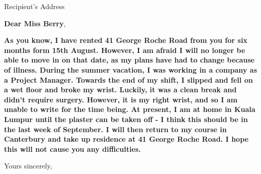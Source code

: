 \documentclass[a4paper,12pt]{letter}
\begin{document}
 
\address{Beijing, China}

\signature{Zhang Wei}

\begin{letter}{Recipient's Address}

\opening{\textbf{Dear Miss Berry},}

\textbf{\color{red} As you know, I have rented 41 George Roche Road from you for six months form 15th August. However, I am afraid I will no longer be able to move in on that date, as my plans have had to change because of illness. During the summer vacation,  I was working in a company as a Project Manager. Towards the end of my shift, I slipped and fell on a wet floor and broke my wrist. Luckily, it was a clean break and didn't 
  require surgery. However, it is my right wrist, and so I am unable to write for the time being. At present, I am at home in Kuala Lumpur until the plaster can be taken off - I think this should be in the last week of September. I will then return to my course in Canterbury and take up residence at 41 George Roche Road. I hope this will not cause you any difficulties.}
  
  
\closing{Yours sincerely,}


\end{letter}
\end{document}
